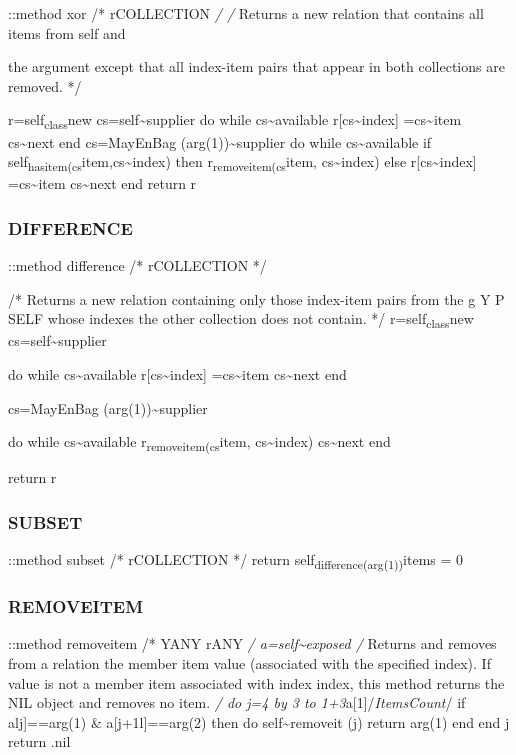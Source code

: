 ::method xor /* rCOLLECTION \emph{/ /} Returns a new relation that
contains all items from self and

the argument except that all index-item pairs that appear in both
collections are removed. */

r=self\textsubscript{class}new cs=self\textasciitilde supplier do while
cs\textasciitilde available r{[}cs\textasciitilde index{]}
=cs\textasciitilde item cs\textasciitilde next end cs=MayEnBag
(arg(1))\textasciitilde supplier do while cs\textasciitilde available if
self\textsubscript{hasitem(cs}item,cs\textasciitilde index) then
r\textsubscript{removeitem(cs}item, cs\textasciitilde index) else
r{[}cs\textasciitilde index{]} =cs\textasciitilde item
cs\textasciitilde next end return r

\subsubsection{DIFFERENCE}\label{difference-2}

::method difference /* rCOLLECTION */

/* Returns a new relation containing only those index-item pairs from
the g Y P SELF whose indexes the other collection does not contain. */
r=self\textsubscript{class}new cs=self\textasciitilde supplier

do while cs\textasciitilde available r{[}cs\textasciitilde index{]}
=cs\textasciitilde item cs\textasciitilde next end

cs=MayEnBag (arg(1))\textasciitilde supplier

do while cs\textasciitilde available r\textsubscript{removeitem(cs}item,
cs\textasciitilde index) cs\textasciitilde next end

return r

\subsubsection{SUBSET}\label{subset-1}

::method subset /* rCOLLECTION */ return
self\textsubscript{difference(arg(1))}items = 0

\subsubsection{REMOVEITEM}\label{removeitem}

::method removeitem /* YANY rANY \emph{/ a=self\textasciitilde exposed
/} Returns and removes from a relation the member item value (associated
with the specified index). If value is not a member item associated with
index index, this method returns the NIL object and removes no item.
\emph{/ do j=4 by 3 to 1+3}a{[}1{]}/\emph{ItemsCount}/ if alj{]}==arg(1)
\& a{[}j+1l{]}==arg(2) then do self\textasciitilde removeit (j) return
arg(1) end end j return .nil

